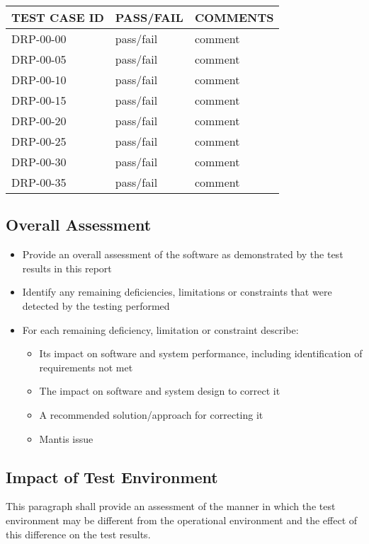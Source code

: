 \documentclass[DM,lsstdraft,STR,toc]{lsstdoc}
\begin{document}
\begin{longtable} {|p{}|p{}|p{}|}\hline
{\bf TEST CASE ID} & {\bf PASS/FAIL} & {\bf COMMENTS} \\\hline
DRP-00-00 & pass/fail & comment \\\hline
DRP-00-05 & pass/fail & comment \\\hline
DRP-00-10 & pass/fail & comment \\\hline
DRP-00-15 & pass/fail & comment \\\hline
DRP-00-20 & pass/fail & comment \\\hline
DRP-00-25 & pass/fail & comment \\\hline
DRP-00-30 & pass/fail & comment \\\hline
DRP-00-35 & pass/fail & comment \\\hline
\end{longtable}


\subsection{Overall Assessment \label{sect:overallassessment}}
\begin{itemize}
\item Provide an overall assessment of the software as demonstrated by the test results in this report
\item Identify any remaining deficiencies, limitations or constraints that were detected by the testing performed
\item For each remaining deficiency, limitation or constraint describe:
\begin{itemize}
\item Its impact on software and system performance, including identification of requirements not met
\item The impact on software and system design to correct it
\item A recommended solution/approach for correcting it
\item Mantis issue
\end{itemize}
\end{itemize}

\subsection{Impact of Test Environment \label{sect:impact}}
This paragraph shall provide an assessment of the manner in which the test environment may be different from the
operational environment and the effect of this difference on the test results.
\end{document}
